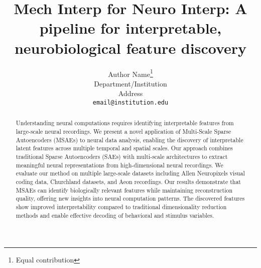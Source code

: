 \documentclass{article}
\title{
  Mech Interp for Neuro Interp: 
  A pipeline for interpretable, neurobiological feature discovery
}
\author{%
  Author Name\thanks{Equal contribution} \\
  Department/Institution \\
  Address \\
  \texttt{email@institution.edu} \\
}
\begin{document}
\maketitle

\begin{abstract}
Understanding neural computations requires identifying interpretable features from large-scale neural recordings. We present a novel application of Multi-Scale Sparse Autoencoders (MSAEs) to neural data analysis, enabling the discovery of interpretable latent features across multiple temporal and spatial scales. Our approach combines traditional Sparse Autoencoders (SAEs) with multi-scale architectures to extract meaningful neural representations from high-dimensional neural recordings. We evaluate our method on multiple large-scale datasets including Allen Neuropixels visual coding data, Churchland datasets, and Aeon recordings. Our results demonstrate that MSAEs can identify biologically relevant features while maintaining reconstruction quality, offering new insights into neural computation patterns. The discovered features show improved interpretability compared to traditional dimensionality reduction methods and enable effective decoding of behavioral and stimulus variables.
\end{abstract}








\end{document}
